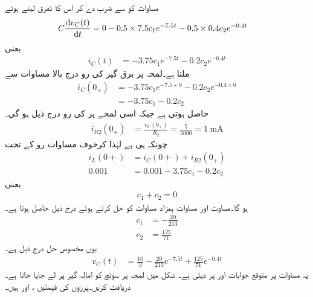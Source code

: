 مساوات  کو  سے ضرب دے کر اس کا تفرق لیتے ہوئے
\begin{align*}
C \frac{\dif v_C(t)}{\dif t}&=0-0.5\times 7.5c_1 e^{-7.5t}-0.5\times 0.4 c_2e^{-0.4t}
\end{align*}
یعنی
\begin{align*}
i_C(t)&=-3.75c_1 e^{-7.5t}-0.2 c_2e^{-0.4t}
\end{align*}
ملتا ہے۔لمحہ  پر برق گیر کی رو درج بالا مساوات سے
\begin{align*}
i_C(0_+)&=-3.75c_1 e^{-7.5\times 0}-0.2 c_2e^{-0.4\times 0}\\
&=-3.75c_1-0.2 c_2
\end{align*}
حاصل ہوتی ہے جبکہ اسی لمحے پر  کی رو درج ذیل ہو گی۔
\begin{align*}
i_{R2}(0_+)&=\frac{v_C(0_+)}{R_2}=\frac{5}{5000}=\SI{1}{\milli\ampere}
\end{align*}
چونکہ  ہی ہے لہٰذا کرخوف مساوات رو کے تحت
\begin{align*}
i_L(0+)&=i_C(0+)+i_{R2}(0_+)\\
0.001&=0.001-3.75c_1-0.2c_2
\end{align*}
یعنی
\begin{align}\label{مساوات_عارضی_مستقل_مثال_دس_ب}
c_1+c_2=0
\end{align}
ہو گا۔مساوت  اور مساوات  ہمزاد مساوات کو حل کرتے ہوئے درج ذیل حاصل ہوتا ہے۔
\begin{align*}
c_1&=-\frac{20}{213}\\
c_2&=\frac{125}{71}
\end{align*}
یوں مخصوص حل درج ذیل ہے۔
\begin{align}
v_C(t)&=\frac{10}{3}-\frac{20}{213} e^{-7.5t}+\frac{125}{71}e^{-0.4t}
\end{align}
یہ مساوات  پر متوقع جوابات  اور  پر  دیتی ہے۔
شکل  میں لمحہ  پر سوئچ کو امالہ گیر پر لے جایا جاتا ہے۔ دریافت کریں۔پرزوں کی قیمتیں ،  اور  ہیں۔
